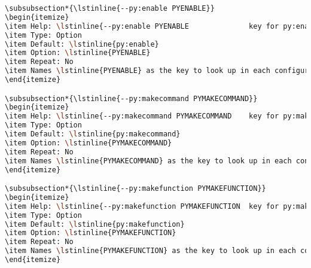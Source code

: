 \begin{snugshade}
\begin{lstlisting}[language=bash]
\subsubsection*{\lstinline{--py:enable PYENABLE}}
\begin{itemize}
\item Help: \lstinline{--py:enable PYENABLE              key for py:enable}
\item Type: Option
\item Default: \lstinline{py:enable}
\item Option: \lstinline{PYENABLE}
\item Repeat: No
\item Names \lstinline{PYENABLE} as the key to look up in each configuration section for determining if the section is enabled by default.
\end{itemize}

\subsubsection*{\lstinline{--py:makecommand PYMAKECOMMAND}}
\begin{itemize}
\item Help: \lstinline{--py:makecommand PYMAKECOMMAND    key for py:makecommand}
\item Type: Option
\item Default: \lstinline{py:makecommand}
\item Option: \lstinline{PYMAKECOMMAND}
\item Repeat: No
\item Names \lstinline{PYMAKECOMMAND} as the key to look up in each configuration section for generating commands to make folders.
\end{itemize}

\subsubsection*{\lstinline{--py:makefunction PYMAKEFUNCTION}}
\begin{itemize}
\item Help: \lstinline{--py:makefunction PYMAKEFUNCTION  key for py:makefunction}
\item Type: Option
\item Default: \lstinline{py:makefunction}
\item Option: \lstinline{PYMAKEFUNCTION}
\item Repeat: No
\item Names \lstinline{PYMAKEFUNCTION} as the key to look up in each configuration section for executing \Python\ commands to make folders.
\end{itemize}


\end{lstlisting}
\end{snugshade}
